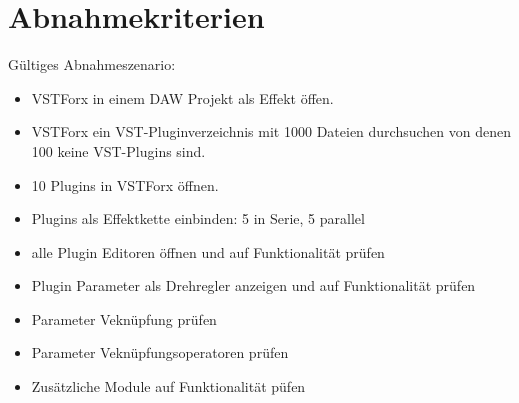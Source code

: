 \section{Abnahmekriterien}

 Gültiges Abnahmeszenario: 
	\begin{itemize}
		\item VSTForx in einem DAW Projekt als Effekt öffen.
		\item VSTForx ein VST-Pluginverzeichnis mit 1000 Dateien durchsuchen von denen 100  keine VST-Plugins sind.
		\item 10 Plugins in VSTForx öffnen.
		\item Plugins als Effektkette einbinden: 5 in Serie, 5 parallel
		\item alle Plugin Editoren öffnen und auf Funktionalität prüfen
		\item Plugin Parameter als Drehregler anzeigen und auf Funktionalität prüfen
		\item Parameter Veknüpfung prüfen
		\item Parameter Veknüpfungsoperatoren prüfen
		\item Zusätzliche Module auf Funktionalität püfen
	\end{itemize}
